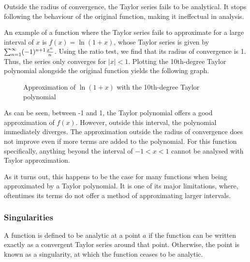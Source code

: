 \documentclass[a4paper, 12pt]{article}
\begin{document}
Outside the radius of convergence, the Taylor series fails to be analytical. It stops following the behaviour of the original function, making it ineffectual in analysis. 

An example of a function where the Taylor series fails to approximate for a large interval of $x$ is $f(x)=\ln(1+x)$, whose Taylor series is given by $\sum_{n=1}^{\infty}(-1)^{n+1}{x^n\over n}$. Using the ratio test, we find that its radius of convergence is 1. Thus, the series only converges for $|x|<1$. Plotting the 10th-degree Taylor polynomial alongside the original function yields the following graph.

\begin{figure}[H]
\centering
{}
\caption{Approximation of $\ln(1+x)$ with the 10th-degree Taylor polynomial}
\end{figure}

As can be seen, between -1 and 1, the Taylor polynomial offers a good approximation of $f(x)$. However, outside this interval, the polynomial immediately diverges. The approximation outside the radius of convergence does not improve even if more terms are added to the polynomial. For this function specifically, anything beyond the interval of $-1<x<1$ cannot be analysed with Taylor approximation.

As it turns out, this happens to be the case for many functions when being approximated by a Taylor polynomial. It is one of its major limitations, where, oftentimes its terms do not offer a method of approximating larger intervals.

\subsubsection{Singularities}
A function is defined to be analytic at a point $a$ if the function can be written exactly as a convergent Taylor series around that point. Otherwise, the point is known as a singularity, at which the function ceases to be analytic.
\end{document}
